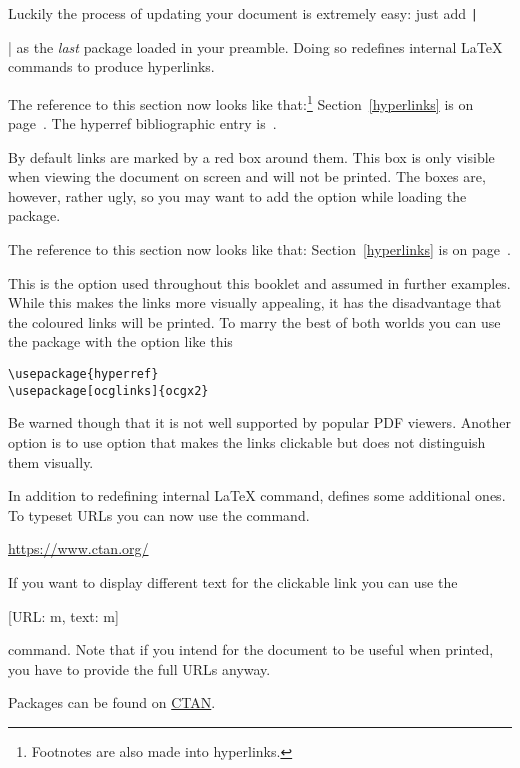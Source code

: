 Luckily the process of updating your document is extremely easy: just add
\texttt|\usepackage{hyperref}| as the \emph{last} package loaded in
your preamble. Doing so redefines internal \LaTeX{} commands to produce
hyperlinks.
\begin{example}
\hypersetup{
  hidelinks,
  pdfborder=0 0 1,
}
\usepackage{hyperref}
The reference to this section
now looks like that:\footnote{
  Footnotes are also
  made into hyperlinks.}
Section~\ref{hyperlinks} is
on page~\pageref{hyperlinks}.
The hyperref bibliographic
entry is~\cite{pack:hyperref}.
\end{example}
By default links are marked by a red box around them. This box
is only visible when viewing the document on screen and will not be printed.
The boxes are, however, rather ugly, so you may want to add the 
option while loading the package.
\begin{example}
\usepackage[
  colorlinks
]{hyperref}
The reference to this section
now looks like that:
Section~\ref{hyperlinks} is
on page~\pageref{hyperlinks}.
\end{example}
This is the option used throughout this booklet and assumed in further
examples. While this makes the links more visually appealing, it has the
disadvantage that the coloured links will be printed. To marry the best of both
worlds you can use the  package with the option
 like this
\begin{code}  
\begin{verbatim}
\usepackage{hyperref}
\usepackage[ocglinks]{ocgx2}
\end{verbatim}
\end{code}
Be warned though that it is not well supported by popular PDF viewers. Another
option is to use option  that makes the links clickable but
does not distinguish them visually.

In addition to redefining internal \LaTeX{} command,  defines
some additional ones. To typeset URLs you can now use the  command.
\begin{example}
\url{https://www.ctan.org/}
\end{example}
If you want to display different text for the clickable link you can use the
\begin{lscommand}
  [URL: m, text: m]
\end{lscommand}
command. Note that if you intend for the document to be useful when printed,
you have to provide the full URLs anyway.
\begin{example}
Packages can be found on
\href{https://www.ctan.org/}{
  CTAN}.
\end{example}

